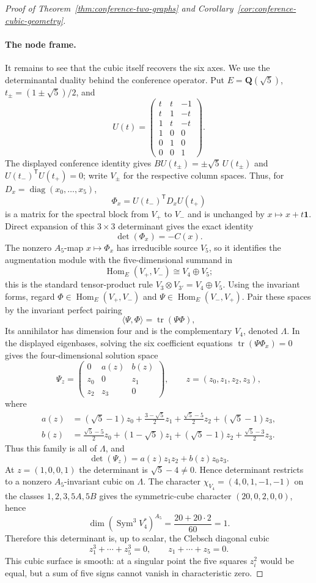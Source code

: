 \documentclass[11pt]{article}
\theoremstyle{definition}
\theoremstyle{remark}
\begin{document}
\begin{proof}[Proof of Theorem~\ref{thm:conference-two-graphs} and
Corollary~\ref{cor:conference-cubic-geometry}]
\paragraph{The node frame.}
It remains to see that the cubic itself recovers the six axes.  We use the
determinantal duality behind the conference operator. Put
$E=\mathbf Q(\sqrt5)$, $t_\pm=(1\pm\sqrt5)/2$, and
\[
 U(t)=
 \begin{pmatrix}
 t&t&-1\\ t&1&-t\\ 1&t&-t\\ 1&0&0\\0&1&0\\0&0&1
 \end{pmatrix}.
\]
The displayed conference identity gives
$BU(t_\pm)=\pm\sqrt5\,U(t_\pm)$ and
$U(t_-)^{\mathsf T}U(t_+)=0$; write $V_\pm$ for the respective column
spaces. Thus, for
$D_x=\operatorname{diag}(x_0,\ldots,x_5)$,
\[
 \Phi_x=U(t_-)^{\mathsf T}D_xU(t_+)
\]
is a matrix for the spectral block from $V_+$ to $V_-$ and is unchanged by
$x\mapsto x+t\mathbf1$. Direct expansion of this $3\times3$ determinant
gives the exact identity
\[
 \det(\Phi_x)=-C(x).
\]
The nonzero $A_5$-map $x\mapsto\Phi_x$ has irreducible source $V_5$, so
it identifies the augmentation module with the five-dimensional summand in
\[
 \operatorname{Hom}_E(V_+,V_-)\cong V_4\oplus V_5;
\]
this is the standard tensor-product rule $V_3\otimes V_{3'}=V_4\oplus V_5$.
Using the invariant forms, regard
$\Phi\in\operatorname{Hom}_E(V_+,V_-)$ and
$\Psi\in\operatorname{Hom}_E(V_-,V_+)$. Pair these spaces by the invariant
perfect pairing
\[
 \langle\Psi,\Phi\rangle=\operatorname{tr}(\Psi\Phi),
\]
Its annihilator has dimension four and is the complementary $V_4$, denoted
$\Lambda$. In the displayed eigenbases,
solving the six coefficient equations
$\operatorname{tr}(\Psi\Phi_x)=0$ gives the four-dimensional solution
space
\[
 \Psi_z=\begin{pmatrix}0&a(z)&b(z)\\z_0&0&z_1\\z_2&z_3&0\end{pmatrix},
 \qquad z=(z_0,z_1,z_2,z_3),
\]
where
\[
\begin{aligned}
a(z)&=(\sqrt5-1)z_0+\frac{3-\sqrt5}{2}z_1
      +\frac{\sqrt5-5}{2}z_2+(\sqrt5-1)z_3,\\
b(z)&=\frac{\sqrt5-5}{2}z_0+(1-\sqrt5)z_1
      +(\sqrt5-1)z_2+\frac{\sqrt5-3}{2}z_3.
\end{aligned}
\]
Thus this family is all of $\Lambda$, and
\[
 \det(\Psi_z)=a(z)z_1z_2+b(z)z_0z_3.
\]
At $z=(1,0,0,1)$ the determinant is $\sqrt5-4\ne0$. Hence determinant
restricts to a nonzero $A_5$-invariant cubic on $\Lambda$. The character
$\chi_{V_4}=(4,0,1,-1,-1)$ on the classes
$1,2,3,5A,5B$ gives the symmetric-cube character $(20,0,2,0,0)$, hence
\[
 \dim(\operatorname{Sym}^3V_4^*)^{A_5}
 =\frac{20+20\cdot2}{60}=1.
\]
Therefore this determinant is,
up to scalar, the Clebsch diagonal cubic
\[
 z_1^3+\cdots+z_5^3=0,\qquad z_1+\cdots+z_5=0.
\]
This cubic surface is smooth: at a singular point the five squares
$z_i^2$ would be equal, but a sum of five signs cannot vanish in
characteristic zero.


\end{proof}
\end{document}

